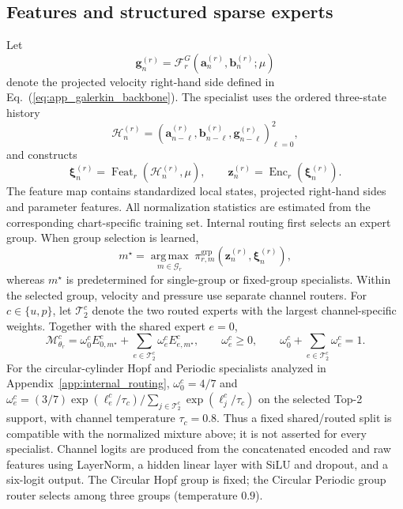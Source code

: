 \documentclass{article}
\def\plaineqref#1{\ref{#1}}
\providecommand{\DIFaddtex}[1]{{\protect\color{blue} \sf #1}} %
\providecommand{\DIFaddbegin}{} %
\providecommand{\DIFadd}[1]{\texorpdfstring{\DIFaddtex{#1}}{#1}} %
\providecommand{\DIFaddincludegraphics}[2][]{{\color{blue}\fbox{\DIFOincludegraphics[#1]{#2}}}} %
\DeclareRobustCommand{\DIFaddbegin}{\DIFOaddbegin \let\includegraphics\DIFaddincludegraphics} %
\begin{document}
\subsection{Features and structured sparse experts}

Let
\begin{equation}
  \bm g_n^{(r)}
  =
  \mathcal F_r^G
  \left(
    \bm a_n^{(r)},\bm b_n^{(r)};\mu
  \right)
  \label{eq:app_galerkin_feature}
\end{equation}
denote the projected velocity right-hand side defined in Eq.~(\plaineqref{eq:app_galerkin_backbone}). The specialist uses the ordered three-state history
\begin{equation}
  \mathcal H_n^{(r)}
  =
  \left(
    \bm a_{n-\ell}^{(r)},
    \bm b_{n-\ell}^{(r)},
    \bm g_{n-\ell}^{(r)}
  \right)_{\ell=0}^{2},
  \label{eq:app_specialist_history}
\end{equation}
and constructs
\begin{equation}
  \bm\xi_n^{(r)}
  =
  \operatorname{Feat}_r
  \left(
    \mathcal H_n^{(r)},\mu
  \right),
  \qquad
  \bm z_n^{(r)}
  =
  \operatorname{Enc}_r
  \left(
    \bm\xi_n^{(r)}
  \right).
  \label{eq:app_specialist_features}
\end{equation}
The feature map contains standardized local states, projected
right-hand sides and parameter features. All normalization statistics are estimated from the corresponding chart-specific training set. Internal routing first selects an expert group. When group selection is learned,
\begin{equation}
  m^\star
  =
  \underset{m\in\mathcal G_r}{\operatorname{arg\,max}}
  \;
  \pi_{r,m}^{\mathrm{grp}}
  \left(
    \bm z_n^{(r)},\bm\xi_n^{(r)}
  \right),
  \label{eq:app_group_top1}
\end{equation}
whereas $m^\star$ is predetermined for single-group or fixed-group
specialists. Within the selected group, velocity and pressure use separate channel routers. For $c\in\{u,p\}$, let $\mathcal T_2^c$ denote the two routed experts with the largest channel-specific weights. Together with the shared expert $e=0$,
\begin{equation}
  \mathcal M_{\theta_r}^c
  =
  \omega_0^c
  E_{0,m^\star}^c
  +
  \sum_{e\in\mathcal T_2^c}
  \omega_e^c
  E_{e,m^\star}^c,
  \qquad
  \omega_e^c\ge0,
  \qquad
  \omega_0^c+\sum_{e\in\mathcal T_2^c}\omega_e^c=1.
  \label{eq:app_channel_sparse_moe}
\end{equation}
\DIFaddbegin \DIFadd{For the circular-cylinder Hopf and Periodic specialists analyzed in Appendix~\ref{app:internal_routing}, $\omega_0^c=4/7$ and $\omega_e^c=(3/7)\exp(\ell_e^c/\tau_c)/\sum_{j\in\mathcal T_2^c}\exp(\ell_j^c/\tau_c)$ on the selected Top-2 support, with channel temperature $\tau_c=0.8$. Thus a fixed shared/routed split is compatible with the normalized mixture above; it is not asserted for every specialist. Channel logits are produced from the concatenated encoded and raw features using LayerNorm, a hidden linear layer with SiLU and dropout, and a six-logit output. The Circular Hopf group is fixed; the Circular Periodic group router selects among three groups (temperature $0.9$).
}
\end{document}
